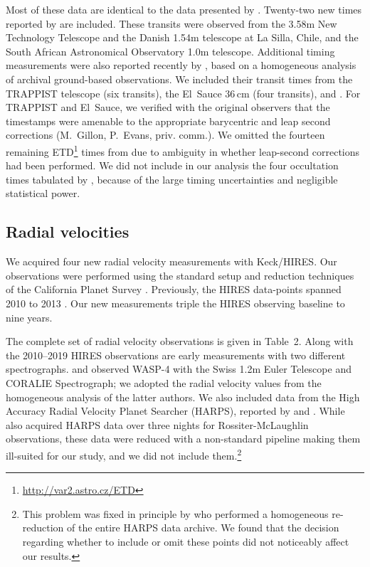 \documentclass[12pt,twocolumn,tighten,trackchanges]{aastex62}
\begin{document}
Most of these data are identical to the data presented by
.  Twenty-two new times reported by
\citet{southworth_transit_2019} are included.  These transits were
observed from the 3.58m New Technology Telescope and the Danish 1.54m
telescope at La Silla, Chile, and the South African Astronomical
Observatory 1.0m telescope.  Additional timing measurements were also
reported recently by \citet{baluev_2019}, based on a homogeneous
analysis of archival ground-based observations.  We included
 their  transit times
from the TRAPPIST telescope (six transits), the El~Sauce 36$\,$cm
(four transits), and \citet{petrucci_no_2013} .
For TRAPPIST and El~Sauce, we verified with the original observers
that the timestamps were amenable to the appropriate barycentric and
leap second corrections (M.~Gillon, P.~Evans, priv{.} comm{.}).  We
omitted the fourteen remaining
ETD\footnote{\url{http://var2.astro.cz/ETD}} times from
\citeauthor{baluev_2019} due to ambiguity in whether leap-second
corrections had been performed.  We did not include in our analysis
the four occultation times tabulated by
, because of the large timing
uncertainties and negligible statistical power.

\subsection{Radial velocities}

We acquired four new radial velocity measurements with Keck/HIRES.
Our observations were performed using the standard setup and reduction
techniques of the California Planet Survey \citep{howard_cps_2010}.
Previously, the HIRES data-points spanned 2010 to 2013
\citep{knutson_friends_2014}.  Our new measurements triple the HIRES
observing baseline to nine years.

The complete set of radial velocity observations is given in Table~2.
Along with the 2010--2019 HIRES observations are early measurements
with two different spectrographs.  \citet{wilson_wasp-4b_2008} and
\citet{triaud_spin-orbit_2010} observed WASP-4 with the Swiss 1.2m
Euler Telescope and CORALIE Spectrograph; we adopted the radial
velocity values from the homogeneous analysis of the latter authors.
We also included data from the High Accuracy Radial Velocity Planet
Searcher (HARPS), reported by \citet{pont_determining_2011} and
\citet{husnoo_observational_2012}.  While
\citet{triaud_spin-orbit_2010} also acquired HARPS data over three
nights for Rossiter-McLaughlin observations, these data were reduced
with a non-standard pipeline making them ill-suited for our study, and
we did not include them.\footnote{This problem was fixed in principle
by \citet{trifonov_public_2020} who performed a homogeneous
re-reduction of the entire HARPS data archive.  We found that the
decision regarding whether to include or omit these points did not
noticeably affect our results.}
\end{document}
